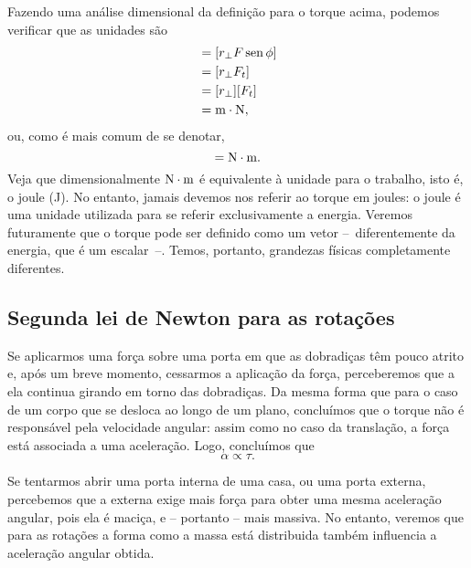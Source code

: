 Fazendo uma análise dimensional da definição para o torque acima, podemos verificar que as unidades são
\begin{align}
    [\tau] &= [r_\perp F \sen\phi] \\
    &= [r_\perp F_t] \\
    &= [r_\perp] [F_t] \\
    &= \rm{m} \cdot \rm{N},
\end{align}
%
ou, como é mais comum de se denotar,
\begin{equation}
    [\tau] = \rm{N}\cdot\rm{m}.
\end{equation}
%
Veja que dimensionalmente $\rm{N}\cdot\rm{m}$ é equivalente à unidade para o trabalho, isto é, o joule (J). No entanto, jamais devemos nos referir ao torque em joules: o joule é uma unidade utilizada para se referir exclusivamente a energia. Veremos futuramente que o torque pode ser definido como um vetor --~diferentemente da energia, que é um escalar~--. Temos, portanto, grandezas físicas completamente diferentes.

\subsection{Segunda lei de Newton para as rotações}

Se aplicarmos uma força sobre uma porta em que as dobradiças têm pouco atrito e, após um breve momento, cessarmos a aplicação da força, perceberemos que a ela continua girando em torno das dobradiças. Da mesma forma que para o caso de um corpo que se desloca ao longo de um plano, concluímos que o torque não é responsável pela velocidade angular: assim como no caso da translação, a força está associada a uma aceleração. Logo, concluímos que
\begin{equation}
	\alpha \propto \tau.
\end{equation}

Se tentarmos abrir uma porta interna de uma casa, ou uma porta externa, percebemos que a externa exige mais força para obter uma mesma aceleração angular, pois ela é maciça, e -- portanto -- mais massiva. No entanto, veremos que para as rotações a forma como a massa está distribuida também influencia a aceleração angular obtida.

